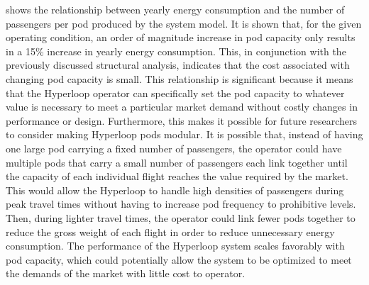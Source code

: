  shows the relationship between yearly energy consumption and the number of passengers per pod produced by the system model. It is shown that, for the given operating condition, an order of magnitude increase in pod capacity only results in a 15\% increase in yearly energy consumption. This, in conjunction with the previously discussed structural analysis, indicates that the cost associated with changing pod capacity is small. This relationship is significant because it means that the Hyperloop operator can specifically set the pod capacity to whatever value is necessary to meet a particular market demand without costly changes in performance or design. Furthermore, this makes it possible for future researchers to consider making Hyperloop pods modular. It is possible that, instead of having one large pod carrying a fixed number of passengers, the operator could have multiple pods that carry a small number of passengers each link together until the capacity of each individual flight reaches the value required by the market. This would allow the Hyperloop to handle high densities of passengers during peak travel times without having to increase pod frequency to prohibitive levels. Then, during lighter travel times, the operator could link fewer pods together to reduce the gross weight of each flight in order to reduce unnecessary energy consumption. The performance of the Hyperloop system scales favorably with pod capacity, which could potentially allow the system to be optimized to meet the demands of the market with little cost to operator.
